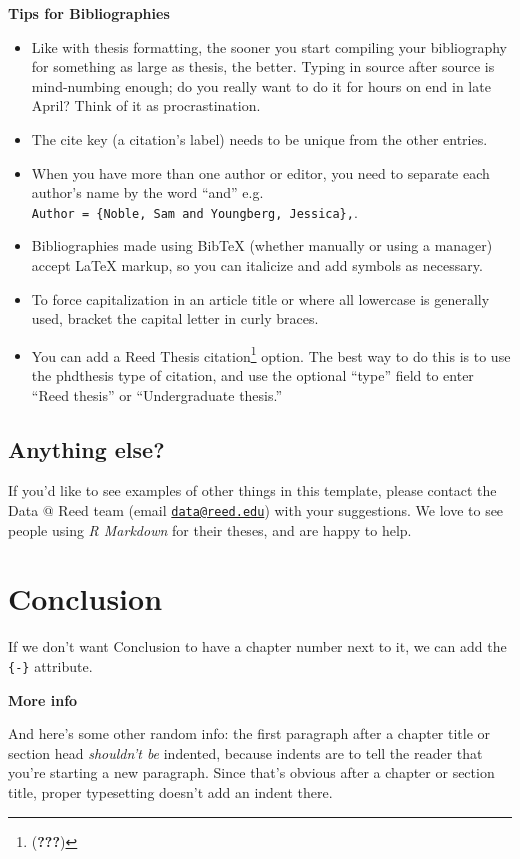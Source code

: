 \documentclass[12pt,twoside]{reedthesis}
\providecommand{\tightlist}{%
  \setlength{\itemsep}{0pt}\setlength{\parskip}{0pt}}
\theoremstyle{definition}
\theoremstyle{definition}
\theoremstyle{definition}
\theoremstyle{remark}
\begin{document}
\textbf{Tips for Bibliographies}
\begin{itemize}
\tightlist
\item
  Like with thesis formatting, the sooner you start compiling your
  bibliography for something as large as thesis, the better. Typing in
  source after source is mind-numbing enough; do you really want to do
  it for hours on end in late April? Think of it as procrastination.
\item
  The cite key (a citation's label) needs to be unique from the other
  entries.
\item
  When you have more than one author or editor, you need to separate
  each author's name by the word ``and'' e.g.
  \texttt{Author\ =\ \{Noble,\ Sam\ and\ Youngberg,\ Jessica\},}.
\item
  Bibliographies made using BibTeX (whether manually or using a manager)
  accept LaTeX markup, so you can italicize and add symbols as
  necessary.
\item
  To force capitalization in an article title or where all lowercase is
  generally used, bracket the capital letter in curly braces.
\item
  You can add a Reed Thesis citation\footnote{({\textbf{???}})} option.
  The best way to do this is to use the phdthesis type of citation, and
  use the optional ``type'' field to enter ``Reed thesis'' or
  ``Undergraduate thesis.''
\end{itemize}
\hypertarget{anything-else}{%
\section{Anything else?}\label{anything-else}}

If you'd like to see examples of other things in this template, please
contact the Data @ Reed team (email
\href{mailto:data@reed.edu}{\nolinkurl{data@reed.edu}}) with your
suggestions. We love to see people using \emph{R Markdown} for their
theses, and are happy to help.

\hypertarget{conclusion}{%
\chapter*{Conclusion}\label{conclusion}}

If we don't want Conclusion to have a chapter number next to it, we can
add the \texttt{\{-\}} attribute.

\textbf{More info}

And here's some other random info: the first paragraph after a chapter
title or section head \emph{shouldn't be} indented, because indents are
to tell the reader that you're starting a new paragraph. Since that's
obvious after a chapter or section title, proper typesetting doesn't add
an indent there.
\end{document}

